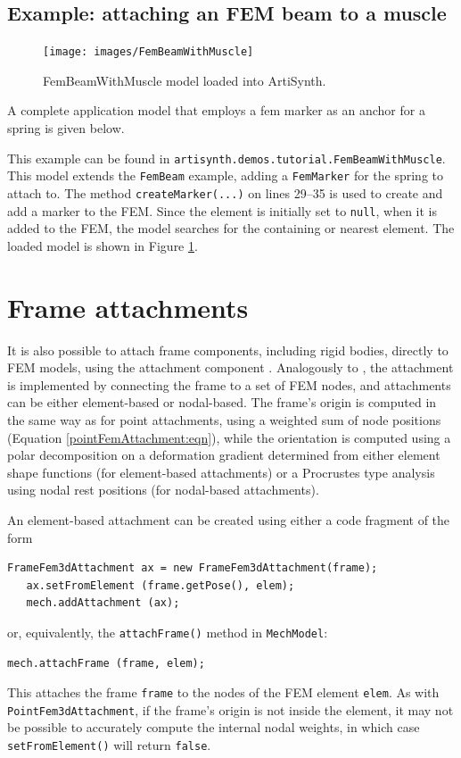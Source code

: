 \subsection{Example: attaching an FEM beam to a muscle}

\begin{figure}[ht]
	\centering
	\texttt{[image: images/FemBeamWithMuscle]}
	\caption{FemBeamWithMuscle model loaded into ArtiSynth.}
	\label{fig:fem:beamwithmuscle}
\end{figure}

A complete application model that employs a fem marker as an anchor for a spring
is given below.
\lstset{numbers=left}

\lstset{numbers=none}
This example can be found in {\tt artisynth.demos.tutorial.FemBeamWithMuscle}.
This model extends the {\tt FemBeam} example, adding a {\tt FemMarker} for the
spring to attach to.  The method {\tt createMarker(...)} on lines 29--35
is used to create and add a marker to the FEM.  Since the element is initially
set to {\tt null}, when it is added to the FEM, the model searches for the
containing or nearest element.  The loaded model is shown in Figure 
\ref{fig:fem:beamwithmuscle}.


\section{Frame attachments}
\label{sec:fem:frameattachments}

It is also possible to attach frame components, including rigid
bodies, directly to FEM models, using the attachment component
.
Analogously to
, the
attachment is implemented by connecting the frame to a set of FEM
nodes, and attachments can be either element-based or nodal-based.  The
frame's origin is computed in the same way as for point attachments,
using a weighted sum of node positions (Equation
\ref{pointFemAttachment:eqn}), while the orientation is computed using
a polar decomposition on a deformation gradient determined from either
element shape functions (for element-based attachments) or a
Procrustes type analysis using nodal rest positions (for nodal-based attachments).

An element-based attachment can be created using either a code fragment
of the form
%
\begin{lstlisting}[]
   FrameFem3dAttachment ax = new FrameFem3dAttachment(frame);
   ax.setFromElement (frame.getPose(), elem);
   mech.addAttachment (ax);
\end{lstlisting}
%
or, equivalently, the {\tt attachFrame()} method in {\tt MechModel}:
%
\begin{lstlisting}[]
   mech.attachFrame (frame, elem);
\end{lstlisting}
%
This attaches the frame {\tt frame} to the nodes of the FEM element
{\tt elem}. As with {\tt PointFem3dAttachment}, if the frame's origin
is not inside the element, it may not be possible to accurately
compute the internal nodal weights, in which case {\tt
setFromElement()} will return {\tt false}.

